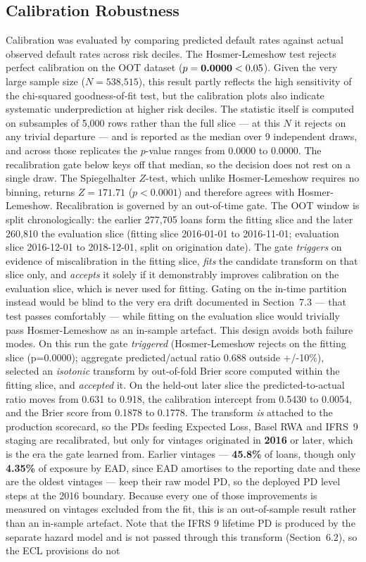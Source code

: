 \documentclass[11pt,a4paper]{article}
\begin{document}
\subsection{Calibration Robustness}
Calibration was evaluated by comparing predicted default rates against actual observed default rates across risk deciles. The Hosmer-Lemeshow test \parencite{hosmer2013} rejects perfect calibration on the OOT dataset ($p = \text{\textbf{0.0000}} < 0.05$). Given the very large sample size ($N = \text{538,515}$), this result partly reflects the high sensitivity of the chi-squared goodness-of-fit test, but the calibration plots also indicate systematic underprediction at higher risk deciles. The statistic itself is computed on subsamples of 5,000 rows rather than the full slice --- at this $N$ it rejects on any trivial departure --- and is reported as the median over 9 independent draws, and across those replicates the $p$-value ranges from 0.0000 to 0.0000. The recalibration gate below keys off that median, so the decision does not rest on a single draw. The Spiegelhalter $Z$-test, which unlike Hosmer-Lemeshow requires no binning, returns $Z=171.71$ ($p<0.0001$) and therefore agrees with Hosmer-Lemeshow. Recalibration is governed by an out-of-time gate. The OOT window is split chronologically: the earlier 277,705 loans form the fitting slice and the later 260,810 the evaluation slice (fitting slice 2016-01-01 to 2016-11-01; evaluation slice 2016-12-01 to 2018-12-01, split on origination date). The gate \emph{triggers} on evidence of miscalibration in the fitting slice, \emph{fits} the candidate transform on that slice only, and \emph{accepts} it solely if it demonstrably improves calibration on the evaluation slice, which is never used for fitting. Gating on the in-time partition instead would be blind to the very era drift documented in Section~7.3 --- that test passes comfortably --- while fitting on the evaluation slice would trivially pass Hosmer-Lemeshow as an in-sample artefact. This design avoids both failure modes. On this run the gate \emph{triggered} (Hosmer-Lemeshow rejects on the fitting slice (p=0.0000); aggregate predicted/actual ratio 0.688 outside +/-10\%), selected an \emph{isotonic} transform by out-of-fold Brier score computed within the fitting slice, and \emph{accepted} it. On the held-out later slice the predicted-to-actual ratio moves from 0.631 to 0.918, the calibration intercept from 0.5430 to 0.0054, and the Brier score from 0.1878 to 0.1778. The transform \emph{is} attached to the production scorecard, so the PDs feeding Expected Loss, Basel RWA and IFRS~9 staging are recalibrated, but only for vintages originated in \textbf{2016} or later, which is the era the gate learned from. Earlier vintages --- \textbf{45.8\%} of loans, though only \textbf{4.35\%} of exposure by EAD, since EAD amortises to the reporting date and these are the oldest vintages --- keep their raw model PD, so the deployed PD level steps at the 2016 boundary. Because every one of those improvements is measured on vintages excluded from the fit, this is an out-of-sample result rather than an in-sample artefact. Note that the IFRS 9 lifetime PD is produced by the separate hazard model and is not passed through this transform (Section~6.2), so the ECL provisions do not 
\end{document}
